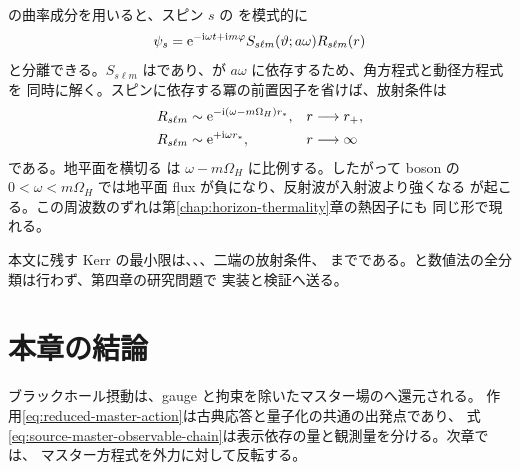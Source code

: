  の曲率成分を用いると、スピン $s$ の を模式的に
\begin{equation}
\psi_s
=
\mathrm{e}^{-\mathrm{i}\omega t+\mathrm{i} m\varphi}
S_{s\ell m}(\vartheta;a\omega)
R_{s\ell m}(r)
\label{eq:teukolsky-separation-minimum}
\end{equation}
と分離できる\cite{Teukolsky:1972my}。$S_{s\ell m}$ はであり、が $a\omega$ に依存するため、角方程式と動径方程式を
同時に解く。スピンに依存する冪の前置因子を省けば、放射条件は
\begin{align}
R_{s\ell m}
&\sim
\mathrm{e}^{-\mathrm{i}(\omega-m\Omega_H)r_*},
&&r\longrightarrow r_+,
\label{eq:kerr-horizon-bc-minimum}
\\
R_{s\ell m}
&\sim
\mathrm{e}^{+\mathrm{i}\omega r_*},
&&r\longrightarrow\infty
\label{eq:kerr-infinity-bc-minimum}
\end{align}
である。地平面を横切る  は
$\omega-m\Omega_H$ に比例する。したがって boson の
$0<\omega<m\Omega_H$ では地平面 flux が負になり、反射波が入射波より強くなる
 が起こる。この周波数のずれは第\ref{chap:horizon-thermality}章の熱因子にも
同じ形で現れる。

本文に残す Kerr の最小限は、、、二端の放射条件、
 までである。と数値法の全分類は行わず、第四章の研究問題で
実装と検証へ送る。

\section{本章の結論}

ブラックホール摂動は、gauge と拘束を除いたマスター場のへ還元される。
作用\eqref{eq:reduced-master-action}は古典応答と量子化の共通の出発点であり、
式\eqref{eq:source-master-observable-chain}は表示依存の量と観測量を分ける。次章では、
マスター方程式を外力に対して反転する。
